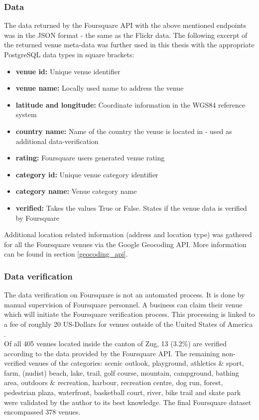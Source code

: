 \subsubsection{Data} \label{fq_data}
The data returned by the Foursquare API with the above mentioned endpoints was in the JSON format - the same as the Flickr data.
The following excerpt of the returned venue meta-data was further used in this thesis with the appropriate PostgreSQL data types in square brackets: \\
\begin{itemize}[label={}]
    \item \textbf{venue id:} Unique venue identifier 
    \item \textbf{venue name:} Locally used name to address the venue 
    \item \textbf{latitude and longitude:} Coordinate information in the WGS84 reference system 
    \item \textbf{country name:} Name of the country the venue is located in - used as additional data-verification 
    \item \textbf{rating:} Foursquare users generated venue rating 
    \item \textbf{category id:} Unique venue category identifier 
    \item \textbf{category name:} Venue category name 
    \item \textbf{verified:} Takes the values True or False. States if the venue data is verified by Foursquare 
\end{itemize}

Additional location related information (address and location type) was gathered for all the Foursquare venues via the Google Geocoding API. More information can be found in section \ref{geocoding_api}.

\subsubsection{Data verification} \label{foursquare_data_verification}
The data verification on Foursquare is not an automated process. It is done by manual supervision of Foursquare personnel. A business can claim their venue which will initiate the Foursquare verification process. This processing is linked to a fee of roughly 20 US-Dollars for venues outside of the United States of America \parencite{Foursquare2019}. \\
Of all 405 venues located inside the canton of Zug, 13 (3.2\%) are verified according to the data provided by the Foursquare API. The remaining non-verified venues of the categories: scenic outlook, playground, athletics \& sport, farm, (nudist) beach, lake, trail, golf course, mountain, campground, bathing area, outdoors \& recreation, harbour, recreation centre, dog run, forest, pedestrian plaza, waterfront, basketball court, river, bike trail and skate park were validated by the author to its best knowledge. The final Foursquare dataset encompassed 378 venues.

